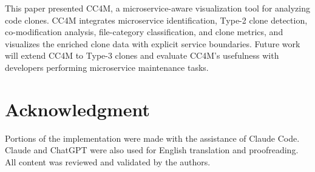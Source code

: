 \documentclass[conference]{IEEEtran}
\begin{document}
This paper presented \textsc{CC4M}, a microservice-aware visualization tool for
analyzing code clones. \textsc{CC4M} integrates microservice identification,
Type-2 clone detection, co-modification analysis, file-category
classification, and clone metrics, and visualizes the enriched clone
data with explicit service boundaries. 
Future work will extend \textsc{CC4M} to Type-3 clones and evaluate \textsc{CC4M}'s
usefulness with developers performing microservice maintenance tasks.

%

\section{Acknowledgment}
Portions of the implementation were made with the assistance of Claude Code. 
Claude and ChatGPT were also used for English translation and proofreading. 
All content was reviewed and validated by the authors.



\end{document}
